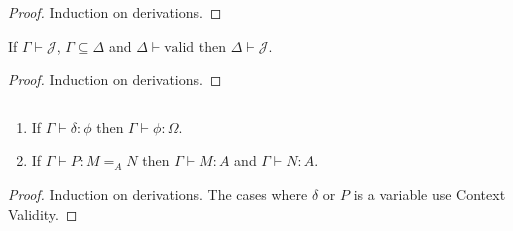 \documentclass[a4paper,UKenglish]{lipics-v2016}
\newcommand*{\vald}{\ensuremath{\vdash \mathrm{valid}}}
\theoremstyle{plain}
\begin{document}
\begin{proof}
Induction on derivations.
\end{proof}

\begin{lemma}[Weakening]
If $\Gamma \vdash \mathcal{J}$, $\Gamma \subseteq \Delta$ and $\Delta \vald$ then $\Delta \vdash \mathcal{J}$.
\end{lemma}

\begin{proof}
Induction on derivations.
\end{proof}

\begin{lemma}
$ $
\begin{enumerate}
\item
If $\Gamma \vdash \delta : \phi$ then $\Gamma \vdash \phi : \Omega$.
\item
If $\Gamma \vdash P : M =_A N$ then $\Gamma \vdash M : A$ and $\Gamma \vdash N : A$.
\end{enumerate}
\end{lemma}

\begin{proof}
Induction on derivations.  The cases where $\delta$ or $P$ is a variable use Context Validity.
\end{proof}
\end{document}
